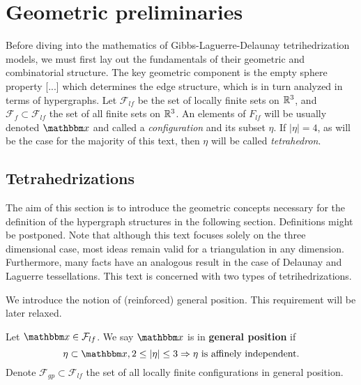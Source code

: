 \chapter{Geometric preliminaries}
Before diving into the mathematics of Gibbs-Laguerre-Delaunay tetrihedrization models, we must first lay out the fundamentals of their geometric and combinatorial structure. The key geometric component is the empty sphere property [...] which determines the edge structure, which is in turn analyzed in terms of hypergraphs.
Let $\mathcal F_{lf}$ be the set of locally finite sets on ${\mathbb R^3}$, and $\mathcal F_{f} \subset \mathcal F_{lf}$ the set of all finite sets on ${\mathbb R^3}$. An elements of $F_{lf}$ will be usually denoted $\x$ and called a \textit{configuration} and its subset $\eta$. If $|\eta|=4$, as will be the case for the majority of this text, then $\eta$ will be called \textit{tetrahedron}.


\section{Tetrahedrizations}
The aim of this section is to introduce the geometric concepts necessary for the definition of the hypergraph structures in the following section. Definitions might be postponed. Note that although this text focuses solely on the three dimensional case, most ideas remain valid for a triangulation in any dimension. Furthermore, many facts have an analogous result in the case of Delaunay and Laguerre tessellations.
This text is concerned with two types of tetrihedrizations. 

We introduce the notion of (reinforced) general position. This requirement will be later relaxed.

\begin{definition}
Let $\x \in \mathcal F_{lf}$. We say $\x$ is in \textbf{general position} if 
$$ \eta \subset \x, 2 \leq |\eta| \leq 3 \Rightarrow \eta \text{ is affinely independent.} $$   
Denote $\mathcal F_{gp}\subset \mathcal F_{lf}$ the set of all locally finite configurations in general position.
\end{definition}
 
